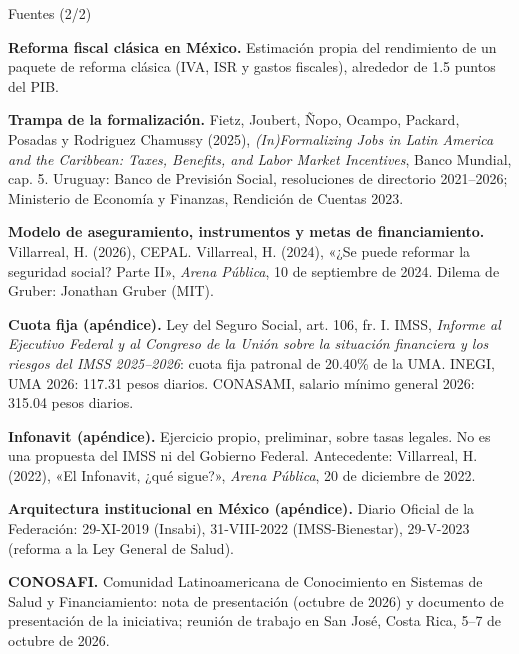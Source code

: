 \documentclass[aspectratio=169,10pt]{beamer}
\begin{document}
\begin{frame}{Fuentes (2/2)}
  \vspace{0.2em}
  {\fontsize{6.6}{8.4}\selectfont\raggedright
  \textbf{Reforma fiscal clásica en México.} Estimación propia del rendimiento de un paquete de reforma clásica (IVA, ISR y gastos fiscales), alrededor de 1.5 puntos del PIB.\par\vspace{0.6em}
  \textbf{Trampa de la formalización.} Fietz, Joubert, Ñopo, Ocampo, Packard, Posadas y Rodriguez Chamussy (2025), \emph{(In)Formalizing Jobs in Latin America and the Caribbean: Taxes, Benefits, and Labor Market Incentives}, Banco Mundial, cap. 5. Uruguay: Banco de Previsión Social, resoluciones de directorio 2021--2026; Ministerio de Economía y Finanzas, Rendición de Cuentas 2023.\par\vspace{0.6em}
  \textbf{Modelo de aseguramiento, instrumentos y metas de financiamiento.} Villarreal, H. (2026), CEPAL. Villarreal, H. (2024), «¿Se puede reformar la seguridad social? Parte II», \emph{Arena Pública}, 10 de septiembre de 2024. Dilema de Gruber: Jonathan Gruber (MIT).\par\vspace{0.6em}
  \textbf{Cuota fija (apéndice).} Ley del Seguro Social, art. 106, fr. I. IMSS, \emph{Informe al Ejecutivo Federal y al Congreso de la Unión sobre la situación financiera y los riesgos del IMSS 2025--2026}: cuota fija patronal de 20.40\% de la UMA. INEGI, UMA 2026: 117.31 pesos diarios. CONASAMI, salario mínimo general 2026: 315.04 pesos diarios.\par\vspace{0.6em}
  \textbf{Infonavit (apéndice).} Ejercicio propio, preliminar, sobre tasas legales. No es una propuesta del IMSS ni del Gobierno Federal. Antecedente: Villarreal, H. (2022), «El Infonavit, ¿qué sigue?», \emph{Arena Pública}, 20 de diciembre de 2022.\par\vspace{0.6em}
  \textbf{Arquitectura institucional en México (apéndice).} Diario Oficial de la Federación: 29-XI-2019 (Insabi), 31-VIII-2022 (IMSS-Bienestar), 29-V-2023 (reforma a la Ley General de Salud).\par\vspace{0.6em}
  \textbf{CONOSAFI.} Comunidad Latinoamericana de Conocimiento en Sistemas de Salud y Financiamiento: nota de presentación (octubre de 2026) y documento de presentación de la iniciativa; reunión de trabajo en San José, Costa Rica, 5--7 de octubre de 2026.\par}
\end{frame}
\end{document}
